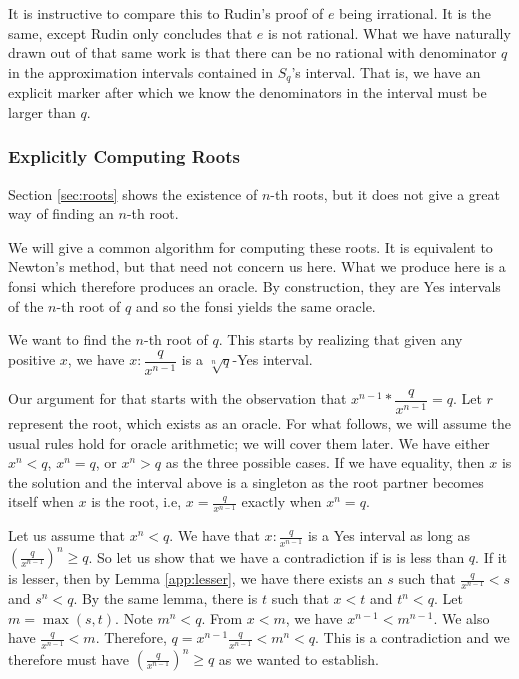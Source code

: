 \documentclass[12pt]{article}
\begin{document}
It is instructive to compare this to Rudin's proof of $e$ being irrational. It is the same, except Rudin only concludes that $e$ is not rational. What we have naturally drawn out of that same work is that there can be no rational with denominator $q$ in the approximation intervals contained in $S_q$'s interval. That is, we have an explicit marker after which we know the denominators in the interval must be larger than $q$. 

\subsubsection{Explicitly Computing Roots}

Section \ref{sec:roots} shows the existence of $n$-th roots, but it does not give a great way of finding an $n$-th root. 

We will give a common algorithm for computing these roots. It is equivalent to Newton's method, but that need not concern us here. What we produce here is a fonsi which therefore produces an oracle. By construction, they are Yes intervals of the $n$-th root of $q$ and so the fonsi yields the same oracle. 

We want to find the $n$-th root of $q$. This starts by realizing that given any positive $x$, we have $x:\dfrac{q}{x^{n-1}}$ is a $\sqrt[n]{q}$-Yes interval.

Our argument for that starts with the observation that $x^{n-1}*\dfrac{q}{x^{n-1}} = q$. Let $r$ represent the root, which exists as an oracle. For what follows, we will assume the usual rules hold for oracle arithmetic; we will cover them later. We have either $x^n < q$, $x^n = q$, or $x^n > q$ as the three possible cases. If we have equality, then $x$ is the solution and the interval above is a singleton as the root partner becomes itself when $x$ is the root, i.e, $x= \frac{q}{x^{n-1}}$ exactly when $x^n  =q$. 

Let us assume that $x^n < q$. We have that $x:\frac{q}{x^{n-1}}$ is a Yes interval as long as $(\frac{q}{x^{n-1}})^n \geq q$. So let us show that we have a contradiction if is is less than $q$. If it is lesser, then by Lemma \ref{app:lesser}, we have there exists an $s$ such that $\frac{q}{x^{n-1}} < s$ and $s^n < q$. By the same lemma, there is $t$ such that $x <t$ and $t^n < q$. Let $m = \max(s, t)$. Note $m^n < q$. From $x < m$, we have $x^{n-1} <m^{n-1}$. We also have $\frac{q}{x^{n-1}} < m$. Therefore, $q = x^{n-1} \frac{q}{x^{n-1}} < m^n < q$. This is a contradiction and we therefore must have $(\frac{q}{x^{n-1}})^n \geq q$ as we wanted to establish. 
\end{document}
